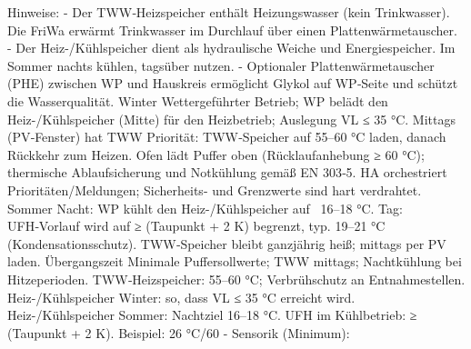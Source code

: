 \markdownRendererDocumentBegin
Hinweise: - Der TWW‑Heizspeicher enthält Heizungswasser (kein Trinkwasser). Die FriWa erwärmt Trinkwasser im Durchlauf über einen Plattenwärmetauscher. - Der Heiz-/Kühlspeicher dient als hydraulische Weiche und Energiespeicher. Im Sommer nachts kühlen, tagsüber nutzen. - Optionaler Plattenwärmetauscher (PHE) zwischen WP und Hauskreis ermöglicht Glykol auf WP‑Seite und schützt die Wasserqualität.\markdownRendererInterblockSeparator
{}\markdownRendererSectionBegin
\markdownRendererSectionBegin
{}\markdownRendererInterblockSeparator
{}\markdownRendererUlBegin
\markdownRendererUlItem Winter\markdownRendererUlItemEnd 
\markdownRendererUlItem Wettergeführter Betrieb; WP belädt den Heiz-/Kühlspeicher (Mitte) für den Heizbetrieb; Auslegung VL ≤ 35 °C.\markdownRendererUlItemEnd 
\markdownRendererUlItem Mittags (PV‑Fenster) hat TWW Priorität: TWW‑Speicher auf 55–60 °C laden, danach Rückkehr zum Heizen.\markdownRendererUlItemEnd 
\markdownRendererUlItem Ofen lädt Puffer oben (Rücklaufanhebung ≥ 60 °C); thermische Ablaufsicherung und Notkühlung gemäß EN 303‑5.\markdownRendererUlItemEnd 
\markdownRendererUlItem HA orchestriert Prioritäten/Meldungen; Sicherheits- und Grenzwerte sind hart verdrahtet.\markdownRendererUlItemEnd 
\markdownRendererUlItem Sommer\markdownRendererUlItemEnd 
\markdownRendererUlItem Nacht: WP kühlt den Heiz-/Kühlspeicher auf ~16–18 °C.\markdownRendererUlItemEnd 
\markdownRendererUlItem Tag: UFH‑Vorlauf wird auf ≥ (Taupunkt + 2 K) begrenzt, typ. 19–21 °C (Kondensationsschutz).\markdownRendererUlItemEnd 
\markdownRendererUlItem TWW‑Speicher bleibt ganzjährig heiß; mittags per PV laden.\markdownRendererUlItemEnd 
\markdownRendererUlItem Übergangszeit\markdownRendererUlItemEnd 
\markdownRendererUlItem Minimale Puffersollwerte; TWW mittags; Nachtkühlung bei Hitzeperioden.\markdownRendererUlItemEnd 
\markdownRendererUlEnd \markdownRendererInterblockSeparator
{}
\markdownRendererSectionEnd \markdownRendererSectionBegin
{}\markdownRendererInterblockSeparator
{}\markdownRendererUlBeginTight
\markdownRendererUlItem TWW‑Heizspeicher: 55–60 °C; Verbrühschutz an Entnahmestellen.\markdownRendererUlItemEnd 
\markdownRendererUlItem Heiz-/Kühlspeicher Winter: so, dass VL ≤ 35 °C erreicht wird.\markdownRendererUlItemEnd 
\markdownRendererUlItem Heiz-/Kühlspeicher Sommer: Nachtziel 16–18 °C.\markdownRendererUlItemEnd 
\markdownRendererUlItem UFH im Kühlbetrieb: ≥ (Taupunkt + 2 K). Beispiel: 26 °C/60 - Sensorik (Minimum):\markdownRendererUlItemEnd 
